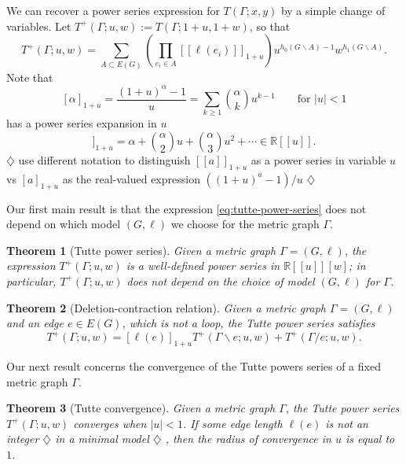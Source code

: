 \documentclass{amsart}
\newtheorem{thm}{Theorem}
\theoremstyle{definition}
\newcommand{\RR}{\mathbb{R}}
\newcommand{\fanalog}[2]{[\![#2]\!]_{#1}}
\newcommand{\harry}[1]{{\color{red} \sf $\diamondsuit$  {#1} $\diamondsuit$ }}
\newcommand{\note}[1]{\harry{#1}}
\begin{document}
We can recover a power series expression for $T(\Gamma; x,y)$ by a simple change of variables.
Let
$T^+(\Gamma; u,w) := T(\Gamma; 1 + u, 1 + w) $,
so that
\begin{equation}
\label{eq:tutte-power-series}
	T^+(\Gamma; u,w) = \sum_{A \subset E(G)} \left( \prod_{e_i \in A} \fanalog{1 + u}{\ell(e_i)} \right)
	u^{h_0(G\backslash A) - 1}w^{h_1(G\backslash A)} .
\end{equation}
Note that
\[ [\alpha]_{1+u} = \frac{(1+u)^\alpha - 1}{u}
= \sum_{k \geq 1} \binom{\alpha}{k}u^{k-1} 
\qquad \text{for } |u|<1
\]
has a power series expansion in $u$ 
\begin{equation}
\fanalog{1 + u}{\alpha} = \alpha + \binom{\alpha}{2} u + \binom{\alpha}{3} u^2 + \cdots
\in \RR[[u]] .
\end{equation}
\note{use different notation to distinguish $\fanalog{1 + u}{a}$ as a power series in variable $u$ 
vs $[a]_{1+u}$ as the real-valued expression $((1+u)^a-1)/u$}

Our first main result is that the expression \eqref{eq:tutte-power-series} does not depend on which  model $(G,\ell)$ we choose for the metric graph $\Gamma$.
\begin{thm}[Tutte power series]
\label{thm:intro-tutte-series}
Given a metric graph $\Gamma = (G,\ell)$,
the expression $T^+(\Gamma; u,w)$
is a well-defined power series in
$\RR[[u]][w]$;
in particular,
$T^+(\Gamma; u,w)$ does not depend on the choice of model $(G,\ell)$ for $\Gamma$.
\end{thm}

\begin{thm}[Deletion-contraction relation]
\label{thm:deletion-contraction}
Given a metric graph $\Gamma = (G,\ell)$ and an edge $e \in E(G)$,
which is not a loop,
the Tutte power series satisfies
\begin{equation*}
T^+(\Gamma; u,w) = [\ell(e)]_{1+u} T^+(\Gamma \backslash e; u,w) + T^+(\Gamma / e; u,w).
\end{equation*}
\end{thm}

Our next result concerns the convergence of the Tutte powers series of a fixed metric graph $\Gamma$.
\begin{thm}[Tutte convergence]
\label{thm:tutte-convergence}
Given a metric graph $\Gamma$,
the Tutte power series $T^+(\Gamma;u,w)$ converges when $|u|<1$.
If some edge length $\ell(e)$ is not an integer \note{in a minimal model},
then the radius of convergence in $u$ is equal to $1$.
\end{thm}
\end{document}
